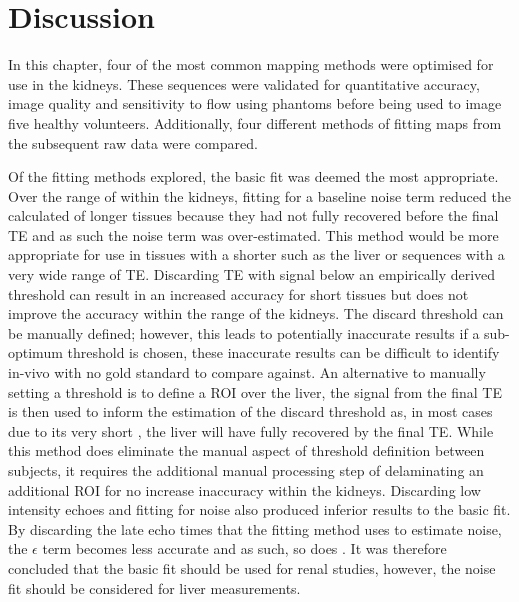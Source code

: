 \newpage

\section{Discussion}

In this chapter, four of the most common \ttwo mapping methods were optimised for use in the kidneys. These sequences were validated for quantitative accuracy, image quality and sensitivity to flow using phantoms before being used to image five healthy volunteers. Additionally, four different methods of fitting \ttwo maps from the subsequent raw data were compared.

Of the fitting methods explored, the basic fit was deemed the most appropriate. Over the range of \ttwo within the kidneys, fitting for a baseline noise term reduced the calculated \ttwo of longer \ttwo tissues because they had not fully recovered before the final \ac{TE} and as such the noise term was over-estimated. This method would be more appropriate for use in tissues with a shorter \ttwo such as the liver or sequences with a very wide range of \ac{TE}. Discarding \ac{TE} with signal below an empirically derived threshold can result in an increased accuracy for short \ttwo tissues but does not improve the accuracy within the range of the kidneys. The discard threshold can be manually defined; however, this leads to potentially inaccurate results if a sub-optimum threshold is chosen, these inaccurate results can be difficult to identify in-vivo with no gold standard to compare against. An alternative to manually setting a threshold is to define a \ac{ROI} over the liver, the signal from the final \ac{TE} is then used to inform the estimation of the discard threshold as, in most cases due to its very short \ttwo, the liver will have fully recovered by the final \ac{TE}. While this method does eliminate the manual aspect of threshold definition between subjects, it requires the additional manual processing step of delaminating an additional \ac{ROI} for no increase inaccuracy within the kidneys. Discarding low intensity echoes and fitting for noise also produced inferior results to the basic fit. By discarding the late echo times that the fitting method uses to estimate noise, the $\epsilon$ term becomes less accurate and as such, so does \ttwo. It was therefore concluded that the basic fit should be used for renal studies, however, the noise fit should be considered for liver \ttwo measurements.

